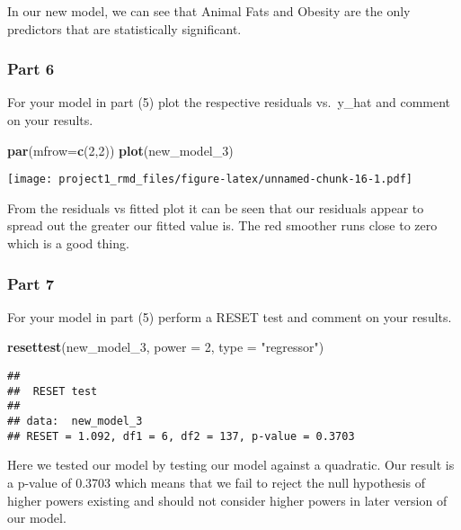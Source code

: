 \documentclass[
]{article}
\newenvironment{Shaded}{\begin{snugshade}}{\end{snugshade}}
\newcommand{\DataTypeTok}[1]{\textcolor[rgb]{0.13,0.29,0.53}{#1}}
\newcommand{\DecValTok}[1]{\textcolor[rgb]{0.00,0.00,0.81}{#1}}
\newcommand{\KeywordTok}[1]{\textcolor[rgb]{0.13,0.29,0.53}{\textbf{#1}}}
\newcommand{\NormalTok}[1]{#1}
\newcommand{\StringTok}[1]{\textcolor[rgb]{0.31,0.60,0.02}{#1}}
\begin{document}
In our new model, we can see that Animal Fats and Obesity are the only
predictors that are statistically significant.

\hypertarget{part-6}{%
\subsubsection{Part 6}\label{part-6}}

For your model in part (5) plot the respective residuals vs.~y\_hat and
comment on your results.

\begin{Shaded}
\begin{Highlighting}[]
\KeywordTok{par}\NormalTok{(}\DataTypeTok{mfrow=}\KeywordTok{c}\NormalTok{(}\DecValTok{2}\NormalTok{,}\DecValTok{2}\NormalTok{))}
\KeywordTok{plot}\NormalTok{(new_model_}\DecValTok{3}\NormalTok{)}
\end{Highlighting}
\end{Shaded}

\texttt{[image: project1\_rmd\_files/figure-latex/unnamed-chunk-16-1.pdf]}

From the residuals vs fitted plot it can be seen that our residuals
appear to spread out the greater our fitted value is. The red smoother
runs close to zero which is a good thing.

\hypertarget{part-7}{%
\subsubsection{Part 7}\label{part-7}}

For your model in part (5) perform a RESET test and comment on your
results.

\begin{Shaded}
\begin{Highlighting}[]
\KeywordTok{resettest}\NormalTok{(new_model_}\DecValTok{3}\NormalTok{, }\DataTypeTok{power =} \DecValTok{2}\NormalTok{, }\DataTypeTok{type =} \StringTok{"regressor"}\NormalTok{)}
\end{Highlighting}
\end{Shaded}

\begin{verbatim}
## 
##  RESET test
## 
## data:  new_model_3
## RESET = 1.092, df1 = 6, df2 = 137, p-value = 0.3703
\end{verbatim}

Here we tested our model by testing our model against a quadratic. Our
result is a p-value of 0.3703 which means that we fail to reject the
null hypothesis of higher powers existing and should not consider higher
powers in later version of our model.
\end{document}
